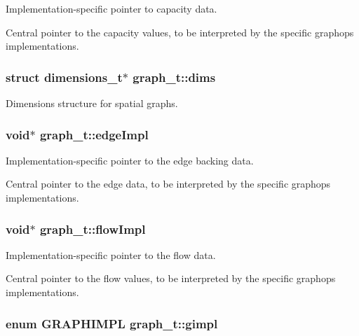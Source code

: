 Implementation-\/specific pointer to capacity data. 

Central pointer to the capacity values, to be interpreted by the specific graphops implementations. 
\subsubsection[{\texorpdfstring{dims}{dims}}]{\setlength{\rightskip}{0pt plus 5cm}struct {\bf dimensions\+\_\+t}$\ast$ graph\+\_\+t\+::dims}\hypertarget{structgraph__t_ad93f0c58ec1bb357b8d33def7259a1a3}{}\label{structgraph__t_ad93f0c58ec1bb357b8d33def7259a1a3}


Dimensions structure for spatial graphs. 

\subsubsection[{\texorpdfstring{edge\+Impl}{edgeImpl}}]{\setlength{\rightskip}{0pt plus 5cm}void$\ast$ graph\+\_\+t\+::edge\+Impl}\hypertarget{structgraph__t_acadea26a56e788cb109413045138faba}{}\label{structgraph__t_acadea26a56e788cb109413045138faba}


Implementation-\/specific pointer to the edge backing data. 

Central pointer to the edge data, to be interpreted by the specific graphops implementations. 
\subsubsection[{\texorpdfstring{flow\+Impl}{flowImpl}}]{\setlength{\rightskip}{0pt plus 5cm}void$\ast$ graph\+\_\+t\+::flow\+Impl}\hypertarget{structgraph__t_aff85993441e72a7815da3fa1b048e5eb}{}\label{structgraph__t_aff85993441e72a7815da3fa1b048e5eb}


Implementation-\/specific pointer to the flow data. 

Central pointer to the flow values, to be interpreted by the specific graphops implementations. 
\subsubsection[{\texorpdfstring{gimpl}{gimpl}}]{\setlength{\rightskip}{0pt plus 5cm}enum {\bf G\+R\+A\+P\+H\+I\+M\+PL} graph\+\_\+t\+::gimpl}\hypertarget{structgraph__t_a220aff118ba6d13c927486099988c03d}{}\label{structgraph__t_a220aff118ba6d13c927486099988c03d}


